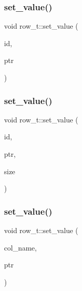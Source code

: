 \mbox{\label{classrow__t_a6abdcb268c944efe100b5a2638003c3d}} 
\subsubsection{\texorpdfstring{set\+\_\+value()}{set\_value()}\hspace{0.1cm}{\footnotesize\ttfamily [1/3]}}
{\footnotesize\ttfamily void row\+\_\+t\+::set\+\_\+value (\begin{DoxyParamCaption}\item[{int}]{id,  }\item[{void $\ast$}]{ptr }\end{DoxyParamCaption})}

\mbox{\label{classrow__t_a0e7044d41f433552ff6f10f1fba7b191}} 
\subsubsection{\texorpdfstring{set\+\_\+value()}{set\_value()}\hspace{0.1cm}{\footnotesize\ttfamily [2/3]}}
{\footnotesize\ttfamily void row\+\_\+t\+::set\+\_\+value (\begin{DoxyParamCaption}\item[{int}]{id,  }\item[{void $\ast$}]{ptr,  }\item[{int}]{size }\end{DoxyParamCaption})}

\mbox{\label{classrow__t_a3eff865812156fd1586a59f7e1d28934}} 
\subsubsection{\texorpdfstring{set\+\_\+value()}{set\_value()}\hspace{0.1cm}{\footnotesize\ttfamily [3/3]}}
{\footnotesize\ttfamily void row\+\_\+t\+::set\+\_\+value (\begin{DoxyParamCaption}\item[{const char $\ast$}]{col\+\_\+name,  }\item[{void $\ast$}]{ptr }\end{DoxyParamCaption})}

